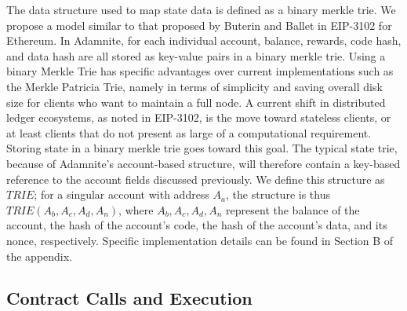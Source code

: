 \documentclass[conference]{IEEEtran}
\begin{document}
The data structure used to map state data is defined as a binary merkle trie. We propose a model similar to that proposed by Buterin and Ballet in EIP-3102 for Ethereum. In Adamnite, for each individual account, balance, rewards, code hash, and data hash are all stored as key-value pairs in a binary merkle trie. Using a binary Merkle Trie has specific advantages over current implementations such as the Merkle Patricia Trie, namely in terms of simplicity and saving overall disk size for clients who want to maintain a full node. A current shift in distributed ledger ecosystems, as noted in EIP-3102, is the move toward stateless clients, or at least clients that do not present as large of a computational requirement. Storing state in a binary merkle trie goes toward this goal. The typical state trie, because of Adamnite's account-based structure, will therefore contain a key-based reference to the account fields discussed previously. We define this structure as $TRIE$; for a singular account with address $A_a$, the structure is thus $TRIE(A_b, A_c, A_d, A_n)$, where $A_b, A_c, A_d, A_n$ represent the balance of the account, the hash of the account's code, the hash of the account's data, and its nonce, respectively. Specific implementation details can be found in Section B of the appendix.\\


\subsection{Contract Calls and Execution}
\end{document}
